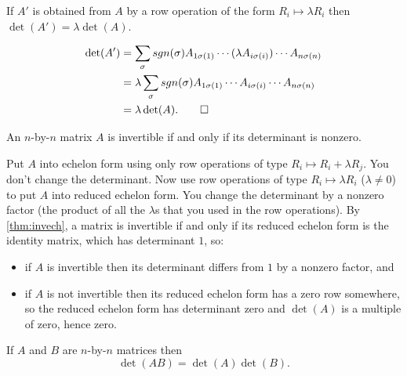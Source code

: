 \documentclass{article}
\begin{document}
\begin{Lemma}\label{lma:detrowII}
If \(A'\) is obtained from \(A\) by a row operation of the form
\(R_i\mapsto \lambda R_i\) then \(\det(A')=\lambda\det(A)\).
\end{Lemma}
\begin{Proof}
\begin{align*}
\det(A')&=\sum_{\sigma}sgn(\sigma)A_{1\sigma(1)}\cdots(\lambda A_{i\sigma(i)})\cdots A_{n\sigma(n)}\\
&=\lambda\sum_{\sigma}sgn(\sigma)A_{1\sigma(1)}\cdots A_{i\sigma(i)}\cdots A_{n\sigma(n)}\\
&=\lambda\det(A). \qedhere
\end{align*}


\end{Proof}
\begin{Theorem}\label{thm:detinv}
An \(n\)-by-\(n\) matrix \(A\) is invertible if and only if its
determinant is nonzero.
\end{Theorem}
\begin{Proof}
Put \(A\) into echelon form using only row operations of type
\(R_i\mapsto R_i+\lambda R_j\). You don't change the
determinant. Now use row operations of type \(R_i\mapsto\lambda
R_i\) (\(\lambda\neq 0\)) to put \(A\) into reduced echelon
form. You change the determinant by a nonzero factor (the product of
all the \(\lambda\)s that you used in the row operations). By
\cref{thm:invech}, a matrix is invertible if and only if its reduced
echelon form is the identity matrix, which has determinant \(1\),
so:
\begin{itemize}
\item if \(A\) is invertible then its determinant differs from \(1\) by
a nonzero factor, and
\item if \(A\) is not invertible then its reduced echelon form has a
zero row somewhere, so the reduced echelon form has determinant
zero and \(\det(A)\) is a multiple of zero, hence zero. \qedhere


\end{itemize}
\end{Proof}
\begin{Theorem}\label{thm:detmult}
If \(A\) and \(B\) are \(n\)-by-\(n\) matrices then
\[\det(AB)=\det(A)\det(B).\]
\end{Theorem}
\end{document}
